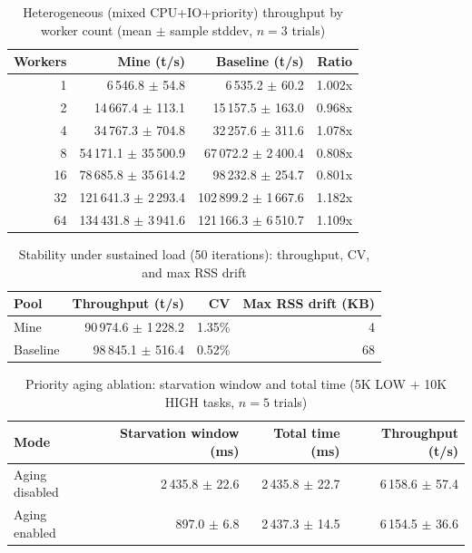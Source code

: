 \begin{table}[htbp]
\centering
\caption{Heterogeneous (mixed CPU+IO+priority) throughput by worker count (mean $\pm$ sample stddev, $n=3$ trials)}
\label{tab:hetero}
\begin{tabular}{rrrr}
\toprule
Workers & Mine (t/s) & Baseline (t/s) & Ratio \\
\midrule
1 & 6\,546.8 $\pm$ 54.8 & 6\,535.2 $\pm$ 60.2 & 1.002x \\
2 & 14\,667.4 $\pm$ 113.1 & 15\,157.5 $\pm$ 163.0 & 0.968x \\
4 & 34\,767.3 $\pm$ 704.8 & 32\,257.6 $\pm$ 311.6 & 1.078x \\
8 & 54\,171.1 $\pm$ 35\,500.9 & 67\,072.2 $\pm$ 2\,400.4 & 0.808x \\
16 & 78\,685.8 $\pm$ 35\,614.2 & 98\,232.8 $\pm$ 254.7 & 0.801x \\
32 & 121\,641.3 $\pm$ 2\,293.4 & 102\,899.2 $\pm$ 1\,667.6 & 1.182x \\
64 & 134\,431.8 $\pm$ 3\,941.6 & 121\,166.3 $\pm$ 6\,510.7 & 1.109x \\
\bottomrule
\end{tabular}
\end{table}

\begin{table}[htbp]
\centering
\caption{Stability under sustained load (50 iterations): throughput, CV, and max RSS drift}
\label{tab:stability}
\begin{tabular}{lrrr}
\toprule
Pool & Throughput (t/s) & CV & Max RSS drift (KB) \\
\midrule
Mine & 90\,974.6 $\pm$ 1\,228.2 & 1.35\% & 4 \\
Baseline & 98\,845.1 $\pm$ 516.4 & 0.52\% & 68 \\
\bottomrule
\end{tabular}
\end{table}

\begin{table}[htbp]
\centering
\caption{Priority aging ablation: starvation window and total time (5K LOW + 10K HIGH tasks, $n=5$ trials)}
\label{tab:aging}
\begin{tabular}{lrrr}
\toprule
Mode & Starvation window (ms) & Total time (ms) & Throughput (t/s) \\
\midrule
Aging disabled & 2\,435.8 $\pm$ 22.6 & 2\,435.8 $\pm$ 22.7 & 6\,158.6 $\pm$ 57.4 \\
Aging enabled & 897.0 $\pm$ 6.8 & 2\,437.3 $\pm$ 14.5 & 6\,154.5 $\pm$ 36.6 \\
\bottomrule
\end{tabular}
\end{table}

